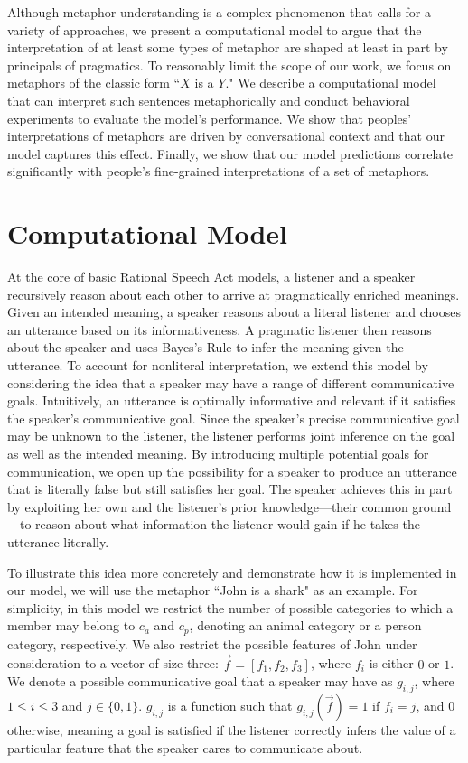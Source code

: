 \documentclass[10pt,letterpaper]{article}
\begin{document}
Although metaphor understanding is a complex phenomenon that calls for a variety of approaches, we present a computational model to argue that the interpretation of at least some types of metaphor are shaped at least in part by principals of pragmatics. To reasonably limit the scope of our work, we focus on metaphors of the classic form ``$X$ is a $Y$." We describe a computational model that can interpret such sentences metaphorically and conduct behavioral experiments to evaluate the model's performance. We show that peoples' interpretations of metaphors are driven by conversational context and that our model captures this effect. Finally, we show that our model predictions correlate significantly with people's fine-grained interpretations of a set of metaphors.

\section{Computational Model}
At the core of basic Rational Speech Act models, a listener and a speaker recursively reason about each other to arrive at pragmatically enriched meanings. Given an intended meaning, a speaker reasons about a literal listener and chooses an utterance based on its informativeness. A pragmatic listener then reasons about the speaker and uses Bayes's Rule to infer the meaning given the utterance. To account for nonliteral interpretation, we extend this model by considering the idea that a speaker may have a range of different communicative goals. Intuitively, an utterance is optimally informative and relevant if it satisfies the speaker's communicative goal. Since the speaker's precise communicative goal may be unknown to the listener, the listener performs joint inference on the goal as well as the intended meaning. By introducing multiple potential goals for communication, we open up the possibility for a speaker to produce an utterance that is literally false but still satisfies her goal. The speaker achieves this in part by exploiting her own and the listener's prior knowledge---their common ground \cite{clark1996using}---to reason about what information the listener would gain if he takes the utterance literally. 

To illustrate this idea more concretely and demonstrate how it is implemented in our model, we will use the metaphor ``John is a shark" as an example. For simplicity, in this model we restrict the number of possible categories to which a member may belong to $c_a$ and $c_p$, denoting an animal category or a person category, respectively. We also restrict the possible features of John under consideration to a vector of size three: $\vec f = [f_1, f_2, f_3]$, where $f_i$ is either $0$ or $1$. We denote a possible communicative goal that a speaker may have as $g_{i,j}$, where $1 \leq i \leq 3$ and $j \in \{0,1\}$. $g_{i,j}$ is a function such that $g_{i,j} (\vec f) = 1$ if $f_i = j$, and $0$ otherwise, meaning a goal is satisfied if the listener correctly infers the value of a particular feature that the speaker cares to communicate about. 
\end{document}
